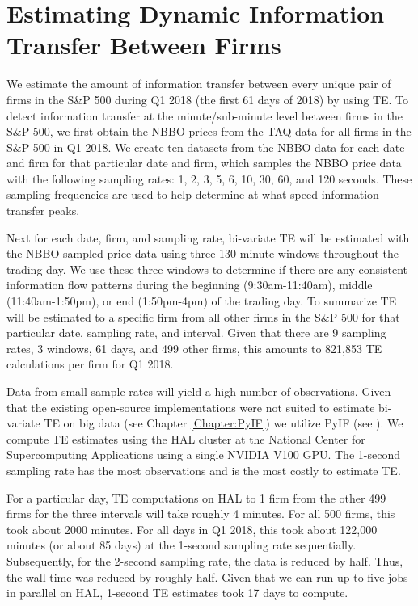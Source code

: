 \section{Estimating Dynamic Information Transfer Between Firms}


We estimate the amount of information transfer between every unique pair of firms in the S\&P 500 during Q1 2018 (the first 61 days of 2018) by using TE. To detect information transfer at the minute/sub-minute level between firms in the S\&P 500, we first obtain the NBBO prices from the TAQ data for all firms in the S\&P 500 in Q1 2018.  We create ten datasets from the NBBO data for each date and firm for that particular date and firm, which samples the NBBO price data with the following sampling rates: 1,  2,  3,  5,  6,  10,  30,  60,  and 120 seconds. These sampling frequencies are used to help determine at what speed information transfer peaks.  

Next for each date,  firm, and sampling rate, bi-variate TE will be estimated with the NBBO sampled price data using three 130 minute windows throughout the trading day. We use these three windows to determine if there are any consistent information flow patterns during the beginning (9:30am-11:40am), middle (11:40am-1:50pm), or end (1:50pm-4pm) of the trading day.  To summarize TE will be estimated to a specific firm from all other firms in the S\&P 500 for that particular date,  sampling rate,  and interval.  Given that there are 9 sampling rates,  3 windows,  61 days,  and 499 other firms, this amounts to 821,853 TE calculations per firm for Q1 2018. 

Data from small sample rates will yield a high number of observations.  Given that the existing open-source implementations were not suited to estimate bi-variate TE on big data (see Chapter \ref{Chapter:PyIF}) we utilize PyIF (see \cite{PyIF}).  We compute TE estimates using the HAL cluster at the National Center for Supercomputing Applications using a single NVIDIA V100 GPU. The 1-second sampling rate has the most observations and is the most costly to estimate TE. 

For a particular day,  TE computations on HAL to 1 firm from the other 499 firms for the three intervals will take roughly 4 minutes.  For all 500 firms, this took about 2000 minutes.  For all days in Q1 2018, this took about 122,000 minutes (or about 85 days) at the 1-second sampling rate sequentially.  Subsequently, for the 2-second sampling rate, the data is reduced by half. Thus, the wall time was reduced by roughly half.   Given that we can run up to five jobs in parallel on HAL, 1-second TE estimates took 17 days to compute. 

